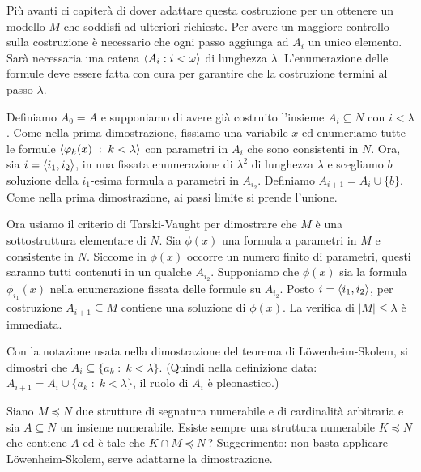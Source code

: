 \begin{void}\label{dim_II_lowenheimskolemallingiu} Pi\`u avanti ci capiter\`a di dover adattare questa costruzione per un ottenere un modello $M$ che soddisfi ad ulteriori richieste. Per avere un maggiore controllo sulla costruzione \`e necessario che ogni passo aggiunga ad $A_i$ un unico elemento. Sar\`a necessaria una catena $\langle A_i:i<\omega\rangle$ di lunghezza $\lambda$. L'enumerazione delle formule deve essere fatta con cura per garantire che la costruzione termini al passo $\lambda$.

Definiamo $A_0=A$ e supponiamo di avere gi\`a costruito l'insieme $A_i\subseteq N$ con $i<\lambda$. Come nella prima dimostrazione, fissiamo una variabile $x$ ed enumeriamo tutte le formule $\langle\varphi_k(x)\;:\;k<\lambda\rangle$ con parametri in $A_i$ che sono consistenti in $N$. Ora, sia $i=\langle i_1,i_2\rangle$, in una fissata enumerazione di $\lambda^2$  di lunghezza $\lambda$ e scegliamo $b$ soluzione della $i_1$-esima formula a parametri in $A_{i_2}$. Definiamo $A_{i+1}=A_i\cup\{b\}$. Come nella prima dimostrazione, ai passi limite si prende l'unione.

Ora usiamo il criterio di Tarski-Vaught per dimostrare che $M$ \`e una sottostruttura elementare di $N$. Sia  $\phi(x)$ una formula a parametri in $M$ e consistente in $N$. Siccome in $\phi(x)$ occorre un numero finito di parametri, questi saranno tutti contenuti in un qualche $A_{i_2}$. Supponiamo che $\phi(x)$ sia la formula $\phi_{i_1}(x)$ nella enumerazione fissata delle formule su $A_{i_2}$. Posto $i=\langle i_1,i_2\rangle$, per costruzione $A_{i+1}\subseteq M$ contiene una soluzione di $\phi(x)$. La verifica di $|M|\le\lambda$ \`e immediata.\QED
\end{void}


\begin{exercise}\label{LSenumerazione}
Con la notazione usata nella dimostrazione del teorema di L\"owenheim-Skolem, si dimostri che $A_i\subseteq\{a_k\;:\;k<\lambda\}$. (Quindi nella definizione data: $A_{i+1}=A_i\cup\{a_k\;:\;k<\lambda\}$, il ruolo di $A_i$ \`e pleonastico.)\QED
\end{exercise}

\begin{exercise}
Siano $M\preceq N$ due strutture di segnatura numerabile e di cardinalit\`a arbitraria e sia $A\subseteq N$ un insieme numerabile. Esiste sempre una struttura numerabile $K\preceq N$ che contiene $A$ ed \`e tale che $K\cap M\preceq N$\,?  Suggerimento: non basta applicare L\"owenheim-Skolem, serve adattarne la dimostrazione.\QED
\end{exercise}
